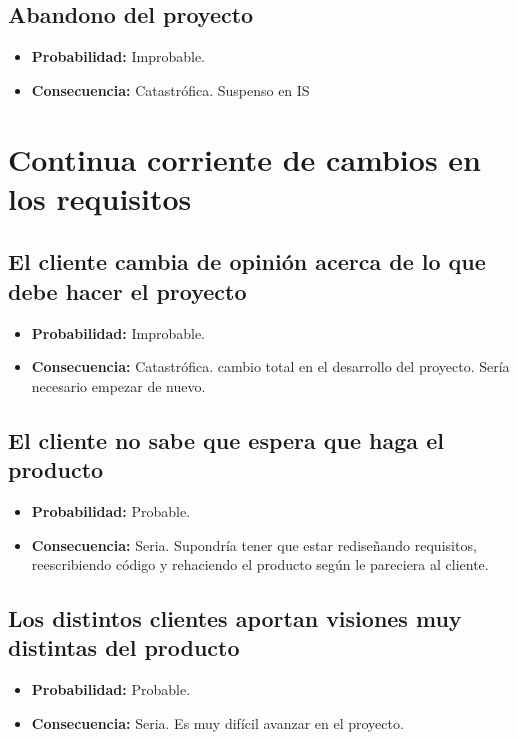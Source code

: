 \documentclass[spanish,a4paper,11pt, twoside]{report}	%
\begin{document}
	\subsection*{Abandono del proyecto}
		\begin{itemize}
			\item \textbf {Probabilidad: }Improbable.
			\item \textbf {Consecuencia: }Catastrófica. Suspenso en IS 	%
		\end{itemize}

%
\section{Continua corriente de cambios en los requisitos}

	\subsection*{El cliente cambia de opinión acerca de lo que debe hacer el proyecto}
		\begin{itemize}
			\item \textbf {Probabilidad: }Improbable.
			\item \textbf {Consecuencia: }Catastrófica. cambio total en el desarrollo del proyecto. Sería necesario empezar de nuevo.
		\end{itemize}
	
	\subsection*{El cliente no sabe que espera que haga el producto}	
		\begin{itemize}
			\item \textbf {Probabilidad: }Probable.
			\item \textbf {Consecuencia: }Seria. Supondría tener que estar rediseñando requisitos, reescribiendo código y rehaciendo el producto según le pareciera al cliente.
		\end{itemize}
	
	\subsection*{Los distintos clientes aportan visiones muy distintas del producto}	
		\begin{itemize}
			\item \textbf {Probabilidad: }Probable.
			\item \textbf {Consecuencia: }Seria. Es muy difícil avanzar en el proyecto.
		\end{itemize}
\end{document}
